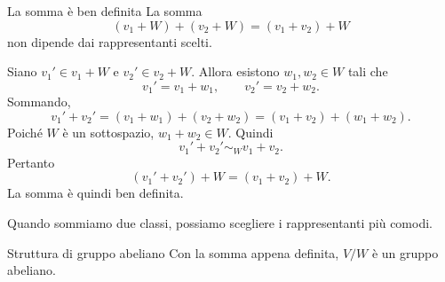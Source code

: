 \documentclass[a4paper]{article}
\begin{document}
\begin{radioactive}
\begin{snippetproposition}{La somma è ben definita}
    La somma
    \[
        (v_1+W)+(v_2+W)
        =
        (v_1+v_2)+W
    \]
    non dipende dai rappresentanti scelti.
\end{snippetproposition}
\end{radioactive}

\begin{radioactive}
\begin{snippetproof}{}
    Siano \(v_1'\in v_1+W\) e \(v_2'\in v_2+W\). Allora esistono \(w_1,w_2 \in W\) tali che
    \[
        v_1'=v_1+w_1,
        \qquad
        v_2'=v_2+w_2.
    \]
    Sommando,
    \[
        v_1'+v_2'
        =
        (v_1+w_1)+(v_2+w_2)
        =
        (v_1+v_2)+(w_1+w_2).
    \]
    Poiché \(W\) è un sottospazio, \(w_1+w_2 \in W\). Quindi
    \[
        v_1'+v_2' \sim_W v_1+v_2.
    \]
    Pertanto
    \[
        (v_1'+v_2')+W
        =
        (v_1+v_2)+W.
    \]
    La somma è quindi ben definita.
\end{snippetproof}
\end{radioactive}

\begin{radioactive}
Quando sommiamo due classi, possiamo scegliere i rappresentanti più comodi.
\end{radioactive}

\begin{radioactive}
\begin{snippetproposition}{Struttura di gruppo abeliano}
    Con la somma appena definita, \(V/W\) è un gruppo abeliano.
\end{snippetproposition}
\end{radioactive}
\end{document}

